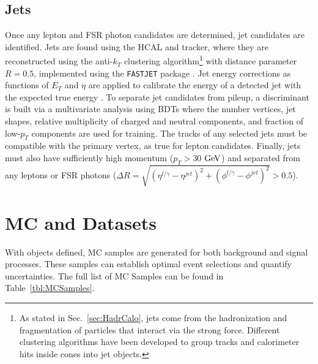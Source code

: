 \subsection{Jets}
\label{sec:zz4lJets}

Once any lepton and FSR photon candidates are determined, jet candidates are identified. Jets are found using the HCAL and tracker, where they are reconstructed using the anti-$k_T$ clustering algorithm\footnote{As stated in Sec.~\ref{sec:HadrCalo}, jets come from the hadronization and fragmentation of particles that interact via the strong force. Different clustering algorithms have been developed to group tracks and calorimeter hits inside cones into jet objects.} \cite{antikt} with distance parameter $R=0.5$, implemented using the {\tt FASTJET} package \cite{Cacciari:2011ma}. Jet energy corrections as functions of $E_T$ and $\eta$ are applied to calibrate the energy of a detected jet with the expected true energy \cite{cmsJEC}. To separate jet candidates from pileup, a discriminant is built \cite{CMS-PAS-JME-13-005} via a multivariate analysis using BDTs where the number vertices, jet shapes, relative multiplicity of charged and neutral components, and fraction of low-$p_T$ components are used for training. The tracks of any selected jets must be compatible with the primary vertex, as true for lepton candidates. Finally, jets must also have sufficiently high momentum ($p_T>30$ $\rm{GeV}$) and separated from any leptons or FSR photons ($\Delta R = \sqrt{(\eta^{l/\gamma}-\eta^{jet})^2 + (\phi^{l/\gamma}-\phi^{jet})^2} > 0.5$).

\section{MC and Datasets}
\label{sec:ZZ4lMCandData}

With objects defined, MC samples are generated for both background and signal processes. These samples can establish optimal event selections and quantify uncertainties. The full list of MC Samples can be found in Table~\ref{tbl:MCSamples}. 

